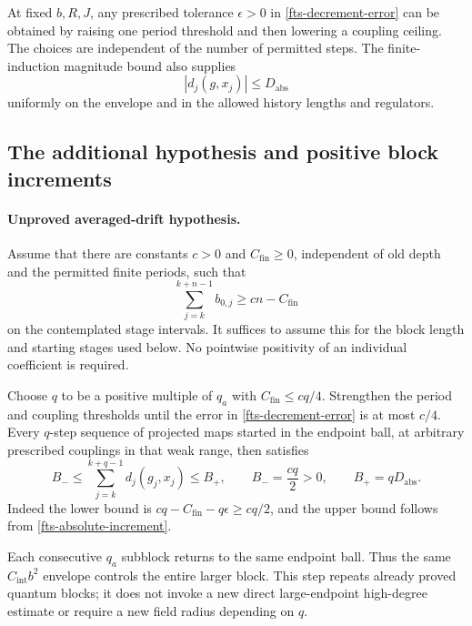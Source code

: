 \documentclass[11pt]{article}
\theoremstyle{remark}
\begin{document}
At fixed $b,R,J$, any prescribed tolerance $\epsilon>0$
in \eqref{fts-decrement-error} can be obtained by raising
one period threshold and then lowering a coupling ceiling.
The choices are independent of the number of permitted
steps. The finite-induction magnitude bound also supplies
\begin{equation}
                 |d_j(g,x_j)|\leq D_{\mathrm{abs}}
 \label{fts-absolute-increment}
\end{equation}
uniformly on the envelope and in the allowed history lengths
and regulators.

\subsection{The additional hypothesis and positive block increments}
\label{fts-hypothesis-section}

\paragraph{Unproved averaged-drift hypothesis.}
Assume that there are constants $c>0$ and
$C_{\mathrm{fin}}\geq0$, independent of old depth and the
permitted finite periods, such that
\begin{equation}
       \sum_{j=k}^{k+n-1}b_{0,j}\geq cn-C_{\mathrm{fin}}
 \label{fts-drift-hypothesis}
\end{equation}
on the contemplated stage intervals. It suffices to assume
this for the block length and starting stages used below.
No pointwise positivity of an individual coefficient is required.

Choose $q$ to be a positive multiple of $q_a$ with
$C_{\mathrm{fin}}\leq cq/4$. Strengthen the period and
coupling thresholds until the error in
\eqref{fts-decrement-error} is at most $c/4$. Every $q$-step
sequence of projected maps started in the endpoint ball,
at arbitrary prescribed couplings in that weak range, then
satisfies
\begin{equation}
 B_-\leq\sum_{j=k}^{k+q-1}d_j(g_j,x_j)\leq B_+,
 \qquad
 B_-=\frac{cq}{2}>0,\qquad B_+=qD_{\mathrm{abs}}.
 \label{fts-block-decrements}
\end{equation}
Indeed the lower bound is
$cq-C_{\mathrm{fin}}-q\epsilon\geq cq/2$, and the upper
bound follows from \eqref{fts-absolute-increment}.

Each consecutive $q_a$ subblock returns to the same endpoint
ball. Thus the same $C_{\mathrm{int}}b^2$ envelope controls
the entire larger block. This step repeats already proved
quantum blocks; it does not invoke a new direct large-endpoint
high-degree estimate or require a new field radius depending
on $q$.
\end{document}
